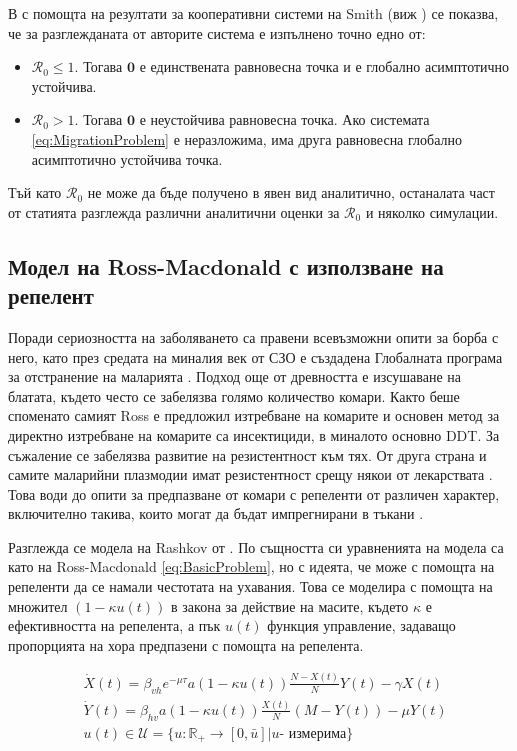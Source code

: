 В \cite{Bichara2016} с помощта на резултати за кооперативни системи на Smith (виж \cite{Smith1986}) се показва, че за разглежданата от авторите система е изпълнено точно едно от:
\begin{itemize}
  \item $\mathscr{R}_0 \leq 1$. Тогава $\mathbf{0}$ е единствената равновесна точка и е глобално асимптотично устойчива.
  \item $\mathscr{R}_0 > 1$. Тогава $\mathbf{0}$ е неустойчива равновесна точка. Ако системата \eqref{eq:MigrationProblem} е неразложима, има друга равновесна глобално асимптотично устойчива точка.
\end{itemize}

Тъй като $\mathscr{R}_0$ не може да бъде получено в явен вид аналитично, останалата част от статията \cite{Bichara2016} разглежда различни аналитични оценки за $\mathscr{R}_0$ и няколко симулации.

\subsection{Модел на Ross-Macdonald с използване на репелент}
Поради сериозността на заболяването са правени всевъзможни опити за борба с него, като през средата на миналия век от СЗО е създадена Глобалната програма за отстранение на маларията \cite{WHO2017}.
Подход още от древността е изсушаване на блатата, където често се забелязва голямо количество комари.
Както беше споменато самият Ross е предложил изтребване на комарите и основен метод за директно изтребване на комарите са инсектициди, в миналото основно DDT.
За съжаление се забелязва развитие на резистентност към тях.
От друга страна и самите маларийни плазмодии имат резистентност срещу някои от лекарствата \cite[глава~83]{Baron1996}.
Това води до опити за предпазване от комари с репеленти от различен характер, включително такива, които могат да бъдат импрегнирани в тъкани \cite{Grancaric2019}.

Разглежда се модела на Rashkov от \cite{Rashkov2022}.
По същността си уравненията на модела са като на Ross-Macdonald \eqref{eq:BasicProblem}, но с идеята, че може с помощта на репеленти да се намали честотата на ухавания.
Това се моделира с помощта на множител $(1 - \kappa u(t))$ в закона за действие на масите, където $\kappa$ е ефективността на репелента, а пък $u(t)$ функция управление, задаващо пропорцията на хора предпазени с помощта на репелента.

\begin{equation}
  \label{eq:RepellentProblem}
  \begin{split}
    &\dot{X}(t) = \beta_{vh} e^{-\mu \tau} a (1-\kappa u(t)) \frac{N-X(t)}{N} Y(t) - \gamma X(t) \\
    &\dot{Y}(t) = \beta_{hv} a (1-\kappa u(t)) \frac{X(t)}{N} (M-Y(t)) - \mu Y(t) \\
    &u(t) \in \mathscr{U} = \{u:\mathbb{R}_+ \rightarrow [0, \bar{u}] \vert u \text{- измерима}\}
  \end{split}
\end{equation}

